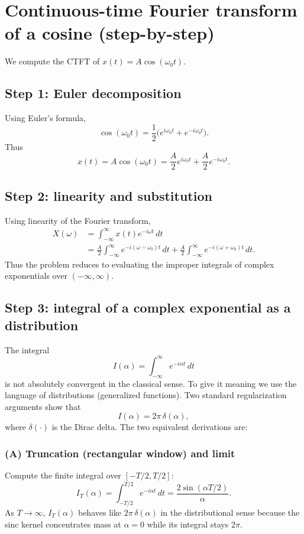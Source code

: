 \documentclass[a4paper]{article}
\begin{document}
\section{Continuous-time Fourier transform of a cosine (step-by-step)}
We compute the CTFT of $x(t)=A\cos(\omega_0 t)$.

\subsection{Step 1: Euler decomposition}
Using Euler's formula,
\begin{equation}
\cos(\omega_0 t)=\frac{1}{2}\big(e^{i\omega_0 t}+e^{-i\omega_0 t}\big).
\end{equation}
Thus
\begin{equation}
x(t)=A\cos(\omega_0 t)=\frac{A}{2}e^{i\omega_0 t}+\frac{A}{2}e^{-i\omega_0 t}.
\end{equation}

\subsection{Step 2: linearity and substitution}
Using linearity of the Fourier transform,
\begin{align}
X(\omega)&=\int_{-\infty}^{\infty} x(t)e^{-i\omega t}\,dt \\
&=\frac{A}{2}\int_{-\infty}^{\infty} e^{-i(\omega-\omega_0)t}\,dt + \frac{A}{2}\int_{-\infty}^{\infty} e^{-i(\omega+\omega_0)t}\,dt.
\end{align}
Thus the problem reduces to evaluating the improper integrals of complex exponentials over $(-\infty,\infty)$.

\subsection{Step 3: integral of a complex exponential as a distribution}
The integral
\begin{equation}
I(\alpha)=\int_{-\infty}^{\infty} e^{-i\alpha t}\,dt
\end{equation}
is not absolutely convergent in the classical sense. To give it meaning we use the language of distributions (generalized functions). Two standard regularization arguments show that
\begin{equation}
I(\alpha)=2\pi\,\delta(\alpha),
\end{equation}
where $\delta(\cdot)$ is the Dirac delta. The two equivalent derivations are:

\subsubsection{(A) Truncation (rectangular window) and limit}
Compute the finite integral over $[-T/2, T/2]$:
\begin{equation}
I_T(\alpha)=\int_{-T/2}^{T/2} e^{-i\alpha t} \,dt = \frac{2\sin(\alpha T/2)}{\alpha}.
\end{equation}
As $T\to\infty$, $I_T(\alpha)$ behaves like $2\pi\,\delta(\alpha)$ in the distributional sense because the sinc kernel concentrates mass at $\alpha=0$ while its integral stays $2\pi$.
\end{document}
